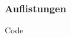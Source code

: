 \begin{frame}
    \frametitle{Auflistungen}
    \begin{block}{Code}
        
        
    \end{block}
\end{frame}
